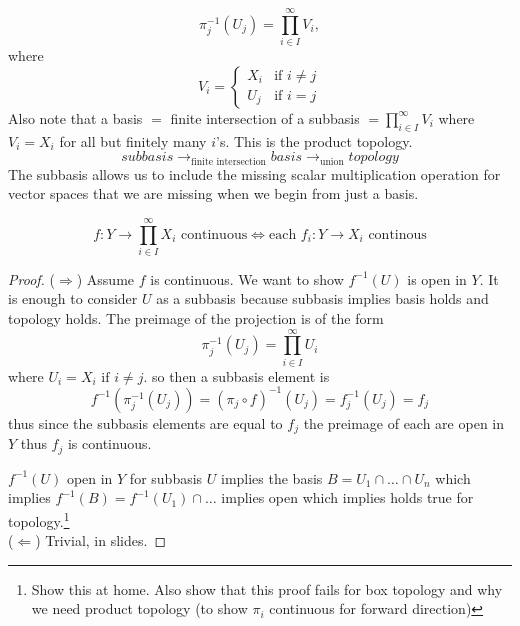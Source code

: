 \documentclass[11pt]{article}
\begin{document}
\begin{example}
    \[
        \pi_j^{-1}(U_j) = \prod_{i \in I}^{\infty} V_i,  
    \]
    where
    \[
        V_i =
        \begin{cases}
            X_i & \text{if } i \ne j \\
            U_j & \text{if } i = j
        \end{cases}
    \]
    Also note that a basis $=$ finite intersection of a subbasis $= \prod_{i \in I}^{\infty} V_i$ where $V_i = X_i$ for all but finitely many $i$'s.
    This is the product topology.
    \[
       subbasis \rightarrow_{\text{finite intersection}}basis \rightarrow_{\text{union}} topology
    \]
    The subbasis allows us to include the missing scalar multiplication operation for vector spaces that we are missing when we begin from just a basis.
\end{example}
\begin{theorem}
   \[
        f: Y \rightarrow \prod_{i\in I}^{\infty} X_i \text{ continuous} \iff \text{each } f_i: Y \rightarrow X_i \text{ continous} 
   \]
    
\end{theorem}
\begin{proof}
    ($\Rightarrow$) Assume $f$ is continuous. We want to show $f^{-1}(U)$ is open in $Y$. It is enough to consider $U$ as a subbasis because subbasis implies basis holds and topology holds.
    The preimage of the projection is of the form
    \[
        \pi_j^{-1}(U_j) = \prod_{i \in I}^{\infty} U_i 
    \]
    where $U_i = X_i\text{ if } i \ne j$.
so then a subbasis element is
\[
    f^{-1}(\pi_j^{-1}(U_j)) = (\pi_j \circ f)^{-1}(U_j) = f_j^{-1}(U_j) = f_j
\]
thus since the subbasis elements are equal to $f_j$ the preimage of each are open in $Y$ thus $f_j$ is continuous.

$f^{-1}(U)$ open in $Y$ for subbasis $U$ implies the basis $B = U_1 \cap \dots \cap U_n$ which implies $f^{-1}(B) = f^{-1}(U_1)\cap \dots$ implies open which implies holds true for topology.\footnote{Show this at home. Also show that this proof fails for box topology and why we need product topology (to show $\pi_i$ continuous for forward direction)}\\
($\Leftarrow$) Trivial, in slides.

\end{proof}
\end{document}
